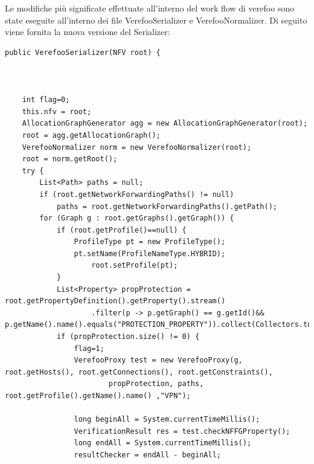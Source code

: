 Le modifiche più significate effettuate all'interno del work flow di verefoo sono state eseguite all'interno dei file VerefooSerializer e VerefooNormalizer.
Di seguito viene fornita la nuova versione del Serializer:

\lstset{language=Java} %

\begin{lstlisting}[caption={Esempio di codice Java}, label=lst:java_example]
    public VerefooSerializer(NFV root) {



    int flag=0;
    this.nfv = root;
    AllocationGraphGenerator agg = new AllocationGraphGenerator(root);
    root = agg.getAllocationGraph();
    VerefooNormalizer norm = new VerefooNormalizer(root);
    root = norm.getRoot();
    try {
        List<Path> paths = null;
        if (root.getNetworkForwardingPaths() != null)
            paths = root.getNetworkForwardingPaths().getPath();
        for (Graph g : root.getGraphs().getGraph()) {
            if (root.getProfile()==null) {
                ProfileType pt = new ProfileType();
                pt.setName(ProfileNameType.HYBRID);
                    root.setProfile(pt);
            }
            List<Property> propProtection = root.getPropertyDefinition().getProperty().stream()
                    .filter(p -> p.getGraph() == g.getId()&& p.getName().name().equals("PROTECTION_PROPERTY")).collect(Collectors.toList());
            if (propProtection.size() != 0) {
                flag=1;
                VerefooProxy test = new VerefooProxy(g, root.getHosts(), root.getConnections(), root.getConstraints(),
                        propProtection, paths, root.getProfile().getName().name() ,"VPN");

                long beginAll = System.currentTimeMillis();
                VerificationResult res = test.checkNFFGProperty();
                long endAll = System.currentTimeMillis();
                resultChecker = endAll - beginAll;


\end{lstlisting}
